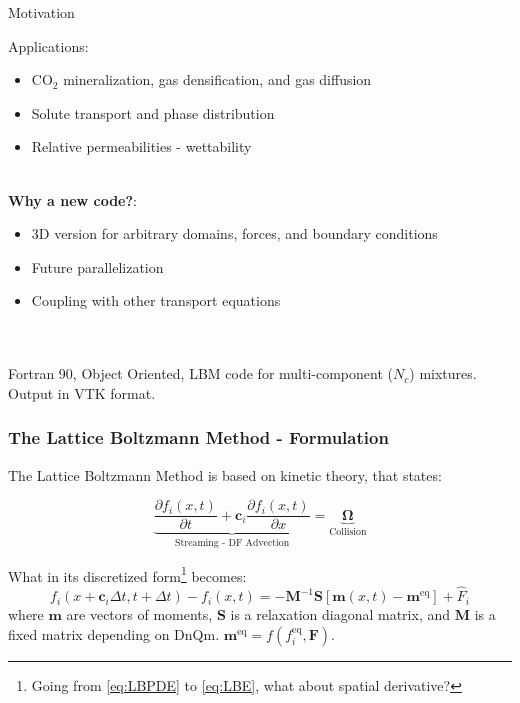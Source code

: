 \documentclass[8pt]{beamer}
\begin{document}
	\begin{frame}{Motivation}
		
		Applications: 
		\begin{itemize}
			\item CO$_2$ mineralization, gas densification, and gas diffusion 
			\item Solute transport and phase distribution
			\item Relative permeabilities - wettability
		\end{itemize}
		
		~\\\textbf{Why a new code?}: 
		\begin{itemize}
			\item 3D version for arbitrary domains, forces, and boundary conditions
			\item Future parallelization
			\item Coupling with other transport equations
		\end{itemize}
		
		~\\~\\Fortran 90, Object Oriented, LBM code for multi-component ($N_c$) mixtures. Output in VTK format.
	\end{frame}


	\begin{frame}[t]
		\frametitle{The Lattice Boltzmann Method - Formulation}
		
		The Lattice Boltzmann Method is based on kinetic theory, that states:
		
		\begin{equation}\label{eq:LBPDE}
			\underbrace{\frac{\partial f_i(x,t)}{\partial t} + \mathbf{c}_i \frac{\partial f_i(x,t)}{\partial x}}_{\text{Streaming - DF Advection}} = \underbrace{\mathbf{\Omega}}_{\text{Collision}} 
		\end{equation}
		
		What in its discretized form\footnote{Going from \ref{eq:LBPDE} to \ref{eq:LBE}, what about spatial derivative?} becomes:
		\begin{equation}\label{eq:LBE}
			f_i(x+ \mathbf{c}_i \Delta t, t+\Delta t) - f_i(x, t) = - \mathbf{M}^{-1} \mathbf{S} [\mathbf{m}(x,t) - \mathbf{m}^{\text{eq}}]  + \hat{F}_i
		\end{equation}
		where $\mathbf{m}$ are vectors of moments, $\mathbf{S}$ is a relaxation diagonal matrix, and $\mathbf{M}$ is a fixed matrix depending on DnQm. $ \mathbf{m}^{\text{eq}} = f(f_i^{\text{eq}}, \mathbf{F})$.
	\end{frame}
	
\end{document}
